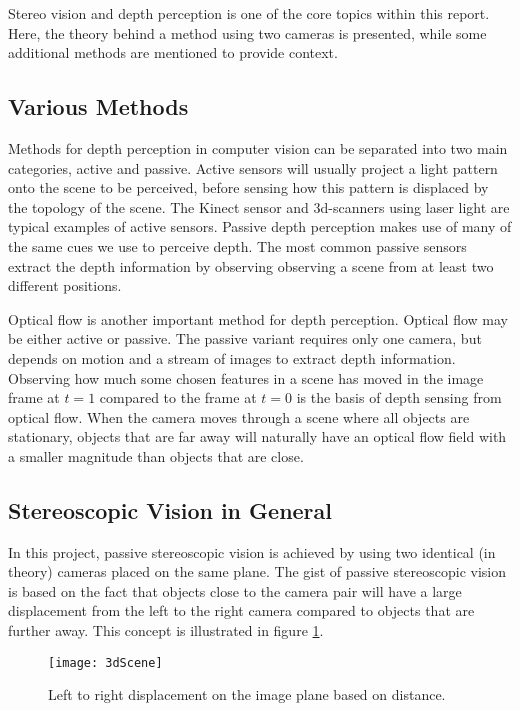 Stereo vision and depth perception is one of the core topics within this report. Here, the theory behind a method using two cameras is presented, while some additional methods are mentioned to provide context. 

\subsection{Various Methods}

Methods for depth perception in computer vision can be separated into two main categories, active and passive\cite{autorobot}. Active sensors will usually project a light pattern onto the scene to be perceived, before sensing how this pattern is displaced by the topology of the scene. The Kinect sensor and 3d-scanners using laser light are typical examples of active sensors. Passive depth perception makes use of many of the same cues we use to perceive depth. The most common passive sensors extract the depth information by observing observing a scene from at least two different positions. 

Optical flow is another important method for depth perception. Optical flow may be either active or passive. The passive variant requires  only one camera, but depends on motion and a stream of images to extract depth information. Observing how much some chosen features in a scene has moved in the image frame at $t = 1$ compared to the frame at $t = 0$ is the basis of depth sensing from optical flow. When the camera moves through a scene where all objects are stationary, objects that are far away will naturally have an optical flow field with a smaller magnitude than objects that are close. 

\subsection{Stereoscopic Vision in General}

In this project, passive stereoscopic vision is achieved by using two identical (in theory) cameras placed on the same plane. The gist of passive stereoscopic vision is based on the fact that objects close to the camera pair will have a large displacement from the left to the right camera compared to objects that are further away. This concept is illustrated in figure \ref{fig:3dScene}.

\begin{figure}
\centering
\texttt{[image: 3dScene]}
\caption{\label{fig:3dScene}Left to right displacement on the image plane based on distance.}
\end{figure} 


